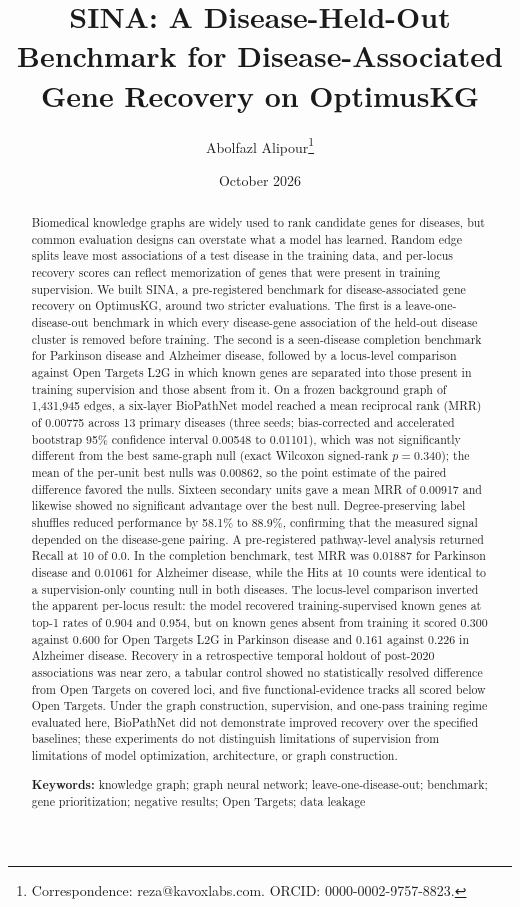 \documentclass[11pt]{article}
\title{SINA: A Disease-Held-Out Benchmark for Disease-Associated Gene Recovery on OptimusKG}
\author{Abolfazl Alipour\thanks{Correspondence: reza@kavoxlabs.com. ORCID: 0000-0002-9757-8823.}}
\date{October 2026}
\begin{document}
\maketitle

\begin{abstract}
\noindent Biomedical knowledge graphs are widely used to rank candidate genes for diseases, but common evaluation designs can overstate what a model has learned. Random edge splits leave most associations of a test disease in the training data, and per-locus recovery scores can reflect memorization of genes that were present in training supervision. We built SINA, a pre-registered benchmark for disease-associated gene recovery on OptimusKG, around two stricter evaluations. The first is a leave-one-disease-out benchmark in which every disease-gene association of the held-out disease cluster is removed before training. The second is a seen-disease completion benchmark for Parkinson disease and Alzheimer disease, followed by a locus-level comparison against Open Targets L2G in which known genes are separated into those present in training supervision and those absent from it. On a frozen background graph of 1,431,945 edges, a six-layer BioPathNet model reached a mean reciprocal rank (MRR) of 0.00775 across 13 primary diseases (three seeds; bias-corrected and accelerated bootstrap 95\% confidence interval 0.00548 to 0.01101), which was not significantly different from the best same-graph null (exact Wilcoxon signed-rank $p = 0.340$); the mean of the per-unit best nulls was 0.00862, so the point estimate of the paired difference favored the nulls. Sixteen secondary units gave a mean MRR of 0.00917 and likewise showed no significant advantage over the best null. Degree-preserving label shuffles reduced performance by 58.1\% to 88.9\%, confirming that the measured signal depended on the disease-gene pairing. A pre-registered pathway-level analysis returned Recall at 10 of 0.0. In the completion benchmark, test MRR was 0.01887 for Parkinson disease and 0.01061 for Alzheimer disease, while the Hits at 10 counts were identical to a supervision-only counting null in both diseases. The locus-level comparison inverted the apparent per-locus result: the model recovered training-supervised known genes at top-1 rates of 0.904 and 0.954, but on known genes absent from training it scored 0.300 against 0.600 for Open Targets L2G in Parkinson disease and 0.161 against 0.226 in Alzheimer disease. Recovery in a retrospective temporal holdout of post-2020 associations was near zero, a tabular control showed no statistically resolved difference from Open Targets on covered loci, and five functional-evidence tracks all scored below Open Targets. Under the graph construction, supervision, and one-pass training regime evaluated here, BioPathNet did not demonstrate improved recovery over the specified baselines; these experiments do not distinguish limitations of supervision from limitations of model optimization, architecture, or graph construction.

\medskip
\noindent\textbf{Keywords:} knowledge graph; graph neural network; leave-one-disease-out; benchmark; gene prioritization; negative results; Open Targets; data leakage
\end{abstract}
\end{document}
